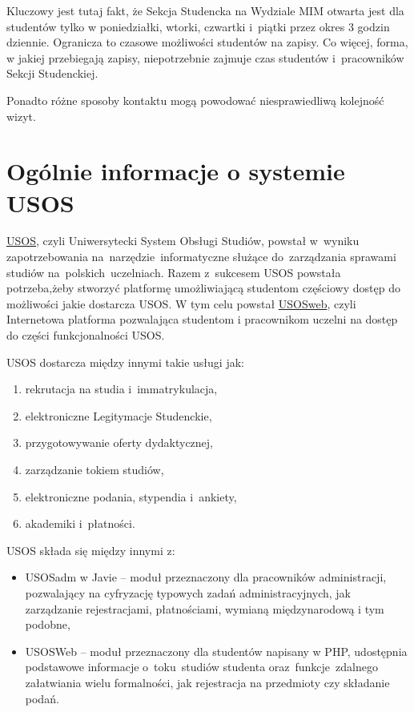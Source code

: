 \documentclass[licencjacka]{pracamgr}
\begin{document}
Kluczowy jest tutaj fakt, że Sekcja Studencka na Wydziale MIM otwarta jest dla studentów tylko w poniedziałki, wtorki, czwartki i~piątki przez okres 3 godzin dziennie. Ogranicza to czasowe możliwości studentów na zapisy. Co więcej, forma, w jakiej przebiegają zapisy, niepotrzebnie zajmuje czas studentów i~pracowników Sekcji Studenckiej.

Ponadto różne sposoby kontaktu mogą powodować niesprawiedliwą kolejność wizyt.


\section{Ogólnie informacje o systemie USOS}
\href{http://usos.edu.pl}{USOS}, czyli Uniwersytecki System Obsługi Studiów, powstał w~wyniku zapotrzebowania na~narzędzie~informatyczne służące do~zarządzania sprawami studiów na~polskich~uczelniach. Razem z~sukcesem USOS powstała potrzeba,żeby stworzyć platformę umożliwiającą studentom częściowy dostęp do możliwości jakie dostarcza USOS. W tym celu powstał \href{htpp://usosweb.uw.edu.pl}{USOSweb}, czyli Internetowa platforma pozwalająca studentom i pracownikom uczelni na dostęp do części funkcjonalności USOS.

USOS dostarcza między innymi takie usługi jak:
\begin{enumerate}
\item rekrutacja na studia i~immatrykulacja,
\item elektroniczne Legitymacje Studenckie,
\item przygotowywanie oferty dydaktycznej,
\item zarządzanie tokiem studiów,
\item elektroniczne podania, stypendia i~ankiety,
\item akademiki i~płatności.
\end{enumerate}

USOS składa się między innymi z:
\begin{itemize}
\item USOSadm w Javie -- moduł przeznaczony dla pracowników administracji, pozwalający na cyfryzację typowych zadań administracyjnych, jak zarządzanie rejestracjami, płatnościami, wymianą międzynarodową i tym podobne,
\item USOSWeb -- moduł przeznaczony dla studentów napisany w PHP, udostępnia podstawowe informacje o~toku~studiów studenta oraz~funkcje~zdalnego załatwiania wielu formalności, jak rejestracja na przedmioty czy składanie podań.
\end{itemize}
\end{document}
